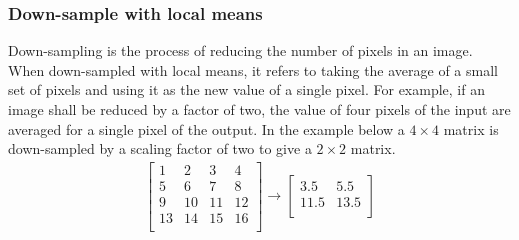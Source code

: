 \subsubsection{Down-sample with local means} \label{sec:t_downsample}
Down-sampling is the process of reducing the number of pixels in an image. When down-sampled with local means, it refers to taking the average of a small set of pixels and using it as the new value of a single pixel. For example, if an image shall be reduced by a factor of two, the value of four pixels of the input are averaged for a single pixel of the output. In the example below a $4\times4$ matrix is down-sampled by a scaling factor of two to give a $2\times2$ matrix.
\begin{align*}
    \begin{bmatrix}
        1  & 2  & 3  & 4\\
        5  & 6  & 7  & 8\\
        9  & 10 & 11 & 12\\
        13 & 14 & 15 & 16\\
    \end{bmatrix} 
    \rightarrow 
    \begin{bmatrix}
        3.5  & 5.5\\
        11.5 & 13.5\\ 
    \end{bmatrix}
\end{align*}
